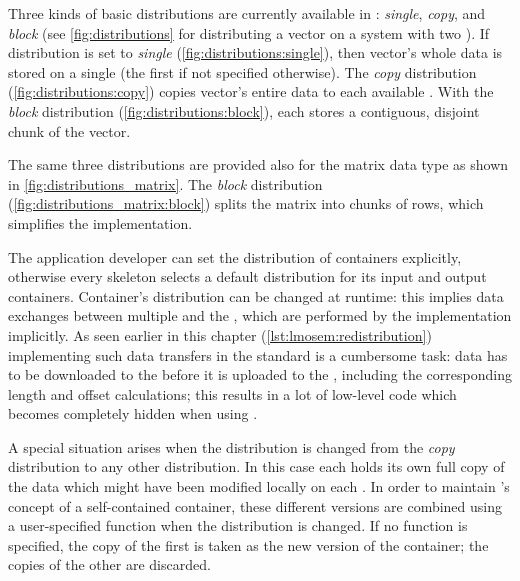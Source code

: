 Three kinds of basic distributions are currently available in \SkelCL:
\emph{single}, \emph{copy}, and \emph{block} (see \autoref{fig:distributions} for distributing a vector on a system with two \GPUs).
If distribution is set to \emph{single} (\autoref{fig:distributions:single}), then vector's whole data is stored on a single \GPU (the first \GPU if not specified otherwise).
The \emph{copy} distribution (\autoref{fig:distributions:copy}) copies vector's entire data to each available \GPU.
With the \emph{block} distribution (\autoref{fig:distributions:block}), each \GPU stores a contiguous, disjoint chunk of the vector.

The same three distributions are provided also for the matrix data type as shown in \autoref{fig:distributions_matrix}.
The \emph{block} distribution (\autoref{fig:distributions_matrix:block}) splits the matrix into chunks of rows, which simplifies the implementation.


The application developer can set the distribution of containers explicitly, otherwise every skeleton selects a default distribution for its input and output containers.
Container's distribution can be changed at runtime:
this implies data exchanges between multiple \GPUs and the \CPU, which are performed by the \SkelCL implementation implicitly.
As seen earlier in this chapter (\autoref{lst:lmosem:redistribution}) implementing such data transfers in the standard \OpenCL is a cumbersome task:
data has to be downloaded to the \CPU before it is uploaded to the \GPUs, including the corresponding length and offset calculations;
this results in a lot of low-level code which becomes completely hidden when using \SkelCL.

A special situation arises when the distribution is changed from the \emph{copy} distribution to any other distribution.
In this case each \GPU holds its own full copy of the data which might have been modified locally on each \GPU.
In order to maintain \SkelCL's concept of a self-contained container, these different versions are combined using a user-specified function when the distribution is changed.
If no function is specified, the copy of the first \GPU is taken as the new version of the container; the copies of the other \GPUs are discarded.



